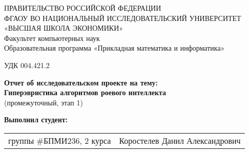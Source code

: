 \begin{titlepage}
    \newpage
    
    {
    \begin{center}
    ПРАВИТЕЛЬСТВО РОССИЙСКОЙ ФЕДЕРАЦИИ\\
    ФГАОУ ВО НАЦИОНАЛЬНЫЙ ИССЛЕДОВАТЕЛЬСКИЙ УНИВЕРСИТЕТ\\
    «ВЫСШАЯ ШКОЛА ЭКОНОМИКИ»
    \\
    \bigskip
    Факультет компьютерных наук\\
    Образовательная программа «Прикладная математика и информатика»
    \end{center}
    }
    
    \vspace{2em}
    УДК 004.421.2 %
    \vspace{4em}
    
    \begin{center}
    {\bf Отчет об исследовательском проекте на тему:}\\
    {\bf Гиперэвристика алгоритмов роевого интеллекта}\\
    (промежуточный, этап 1)
    \end{center}
    
    \vspace{2em}
    
    {\bf Выполнил студент: \vspace{2mm}}
    
    {
    \begin{tabular}{l@{\hskip 1.5cm}l}
    группы \#БПМИ236, 2 курса & Коростелев Данил Александрович \\
    \end{tabular}}
    
    

\end{titlepage}
